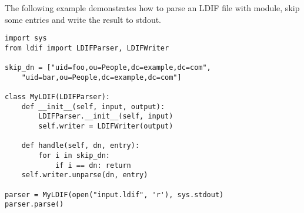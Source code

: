 The following example demonstrates how to parse an LDIF file
with  module, skip some entries and write the result
to stdout.

\begin{verbatim}
import sys
from ldif import LDIFParser, LDIFWriter

skip_dn = ["uid=foo,ou=People,dc=example,dc=com", 
    "uid=bar,ou=People,dc=example,dc=com"]

class MyLDIF(LDIFParser):
    def __init__(self, input, output):
        LDIFParser.__init__(self, input)
        self.writer = LDIFWriter(output)

    def handle(self, dn, entry):
        for i in skip_dn:
            if i == dn: return
	self.writer.unparse(dn, entry)

parser = MyLDIF(open("input.ldif", 'r'), sys.stdout)
parser.parse()
\end{verbatim}

